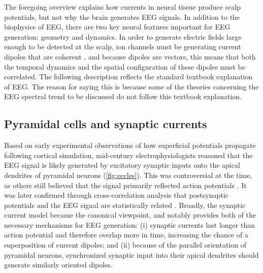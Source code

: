 The foregoing overview explains how currents in neural tissue produce scalp potentials, but not why the brain generates EEG signals. In addition to the biophysics of EEG, there are two key neural features important for EEG generation: geometry and dynamics. In order to generate electric fields large enough to be detected at the scalp, ion channels must be generating current dipoles that are coherent \cite{Buzsaki2012, Nunez2006}, and because dipoles are vectors, this means that both the temporal dynamics and the spatial configuration of these dipoles must be correlated. The following description reflects the standard textbook explanation of EEG. The reason for saying this is because some of the theories concerning the EEG spectral trend to be discussed do not follow this textbook explanation.

\subsection{Pyramidal cells and synaptic currents}

Based on early experimental observations of how superficial potentials propagate following cortical simulation, mid-century electrophysiologists \cite{Eccles1951} reasoned that the EEG signal is likely generated by excitatory synaptic inputs onto the apical dendrites of pyramidal neurons (\autoref{fig:eccles}). This was controversial at the time, as others still believed that the signal primarily reflected action potentials \cite{Burns1950}. It was later confirmed through cross-correlation analysis that postsynaptic potentials and the EEG signal are statistically related \cite{KLEE1965}. Broadly, the synaptic current model became the canonical viewpoint, and notably provides both of the necessary mechanisms for EEG generation: (i) synaptic currents last longer than action potential and therefore overlap more in time, increasing the chance of a superposition of current dipoles; and (ii) because of the parallel orientation of pyramidal neurons, synchronized synaptic input into their apical dendrites should generate similarly oriented dipoles.

